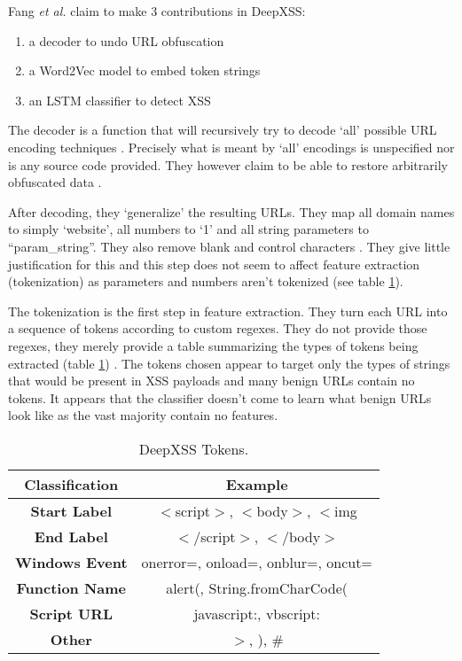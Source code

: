 Fang \textit{et al.} claim to make 3 contributions in DeepXSS:

\begin{enumerate}
\item a decoder to undo URL obfuscation
\item a Word2Vec model to embed token strings
\item an LSTM classifier to detect XSS
\end{enumerate}

The decoder is a function that will recursively try to decode `all' possible URL encoding techniques \cite{fang2018deepxss}. Precisely what is meant by `all' encodings is unspecified nor is any source code provided. They however claim to be able to restore arbitrarily obfuscated data \cite{fang2018deepxss}.

After decoding, they `generalize' the resulting URLs. They map all domain names to simply `website', all numbers to `1' and all string parameters to ``param\_string''. They also remove blank and control characters \cite{fang2018deepxss}. They give little justification for this and this step does not seem to affect feature extraction (tokenization) as parameters and numbers aren't tokenized (see table \ref{tok:tab}). 

The tokenization is the first step in feature extraction. They turn each URL into a sequence of tokens according to custom regexes. They do not provide those regexes, they merely provide a table summarizing the types of tokens being extracted (table \ref{tok:tab}) \cite{fang2018deepxss}. The tokens chosen appear to target only the types of strings that would be present in XSS payloads and many benign URLs contain no tokens. It appears that the classifier doesn't come to learn what benign URLs look like as the vast majority contain no features. 

\begin{table}
\begin{center}
\begingroup
\setlength{\tabcolsep}{5pt} %
\renewcommand{\arraystretch}{1.5} %
\begin{tabular}{||c | c||} 
    \hline
    Classification & Example \\ [0.5ex] 
    \hline\hline
    \textbf{Start Label} &  $<$script$>$, $<$body$>$, $<$img \\ 
    \hline
    \textbf{End Label} & $</$script$>$, $</$body$>$ \\
    \hline
    \textbf{Windows Event} & onerror=, onload=, onblur=, oncut= \\
    \hline
    \textbf{Function Name} & alert(, String.fromCharCode( \\
    \hline
    \textbf{Script URL} & javascript:, vbscript: \\ 
    \hline
    \textbf{Other} & $>$, ), \# \\ [1ex] 
    \hline
\end{tabular}
\endgroup
\caption{\label{tok:tab}DeepXSS Tokens.}
\end{center}
\end{table}

